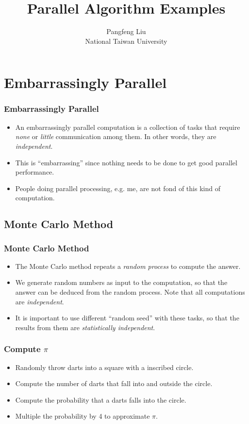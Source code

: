 \documentclass{beamer}
\begin{document}
\begin{CJK}{UTF8}{bsmi}

\title{Parallel Algorithm Examples}

\author{Pangfeng Liu \\ National Taiwan University}

\begin{frame}
\titlepage
\end{frame}


\section{Embarrassingly Parallel}

\begin{frame}
\frametitle{Embarrassingly Parallel}
\begin{itemize}
\item An embarrassingly parallel computation is a collection of tasks
  that require {\em none} or {\em little} communication among them.
  In other words, they are {\em independent}.
\item This is ``embarrassing'' since nothing needs to be done to get
  good parallel performance.
\item People doing parallel processing, e.g. me, are not fond of this
  kind of computation.
\end{itemize}
\end{frame}

\subsection{Monte Carlo Method}

\begin{frame}
\frametitle{Monte Carlo Method}
\begin{itemize}
\item The Monte Carlo method repeats a {\em random process} to compute
  the answer.
\item We generate random numbers as input to the computation, so that
  the answer can be deduced from the random process.  Note that all
  computations are {\em independent}.
\item It is important to use different ``random seed'' with these
  tasks, so that the results from them are {\em statistically
    independent}.
\end{itemize}
\end{frame}

\begin{frame}
\frametitle{Compute $\pi$}
\begin{itemize}
\item Randomly throw darts into a square with a inscribed circle.
\item Compute the number of darts that fall into and outside the
  circle.
\item Compute the probability that a darts falls into the circle.
\item Multiple the probability by 4 to approximate $\pi$.
\end{itemize}
\end{frame}


\end{CJK}
\end{document}
